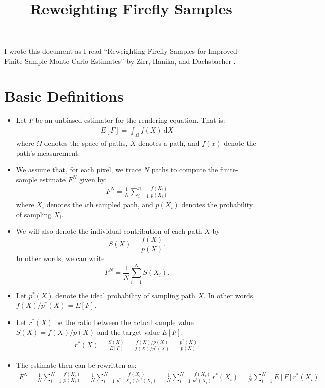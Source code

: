 \documentclass[10pt]{article}
\title{Reweighting Firefly Samples}
\author{}
\newcommand{\dee}{\mathrm{d}}
\begin{document}
  \maketitle

  I wrote this document as I read ``Reweighting Firefly Samples for Improved Finite-Sample Monte Carlo Estimates'' by Zirr, Hanika, and Dachsbacher \cite{Zirr:2018}.

  \section{Basic Definitions}

  \begin{itemize}
  	\item Let $F$ be an unbiased estimator for the rendering equation. That is:
  	\begin{align*}
  		E[F] = \int_{\Omega} f(X)\ \dee X
  	\end{align*}
  	where $\Omega$ denotes the space of paths, $X$ denotes a path, and $f(x)$ denote the path's measurement.

  	\item We assume that, for each pixel, we trace $N$ paths to compute the finite-sample estimate $F^N$ given by:
  	\begin{align*}
  		F^N = \frac{1}{N} \sum_{i=1}^n \frac{f(X_i)}{p(X_i)}
  	\end{align*}
  	where $X_i$ denotes the $i$th sampled path, and $p(X_i)$ denotes the probability of sampling $X_i$. 

  	\item We will also denote the individual contribution of each path $X$ by $$S(X) = \frac{f(X)}{p(X)}.$$ In other words, we can write $$F^N = \frac{1}{N} \sum_{i=1}^N S(X_i).$$

  	\item Let $p^*(X)$ denote the ideal probability of sampling path $X$. In other words, $f(X)/p^*(X) = E[F]$.

  	\item Let $r^*(X)$ be the ratio between the actual sample value $S(X) = f(X)/p(X)$ and the target value $E[F]$:
  	\begin{align*}
  		r^*(X) = \frac{S(X)}{E[F]} = \frac{f(X)/p(X)}{f(X)/p^*(X)} = \frac{p^*(X)}{p(X)}.
  	\end{align*}

  	\item The estimate then can be rewritten as:
  	\begin{align*}
  		F^N 
  		= \frac{1}{N} \sum_{i=1}^N \frac{f(X_i)}{p(X_i)}
  		= \frac{1}{N} \sum_{i=1}^N \frac{f(X_i)}{p^*(X_i)/r^*(X_i)}
  		= \frac{1}{N} \sum_{i=1}^N \frac{f(X_i)}{p^*(X_i)} r^*(X_i)
  		= \frac{1}{N} \sum_{i=1}^N E[F] r^*(X_i).
  	\end{align*}


\end{itemize}
\end{document}
